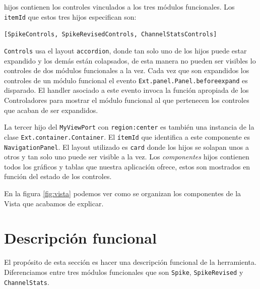 	hijos contienen los controles vinculados a los tres módulos funcionales. Los \texttt{itemId} que estos tres hijos especifican son:
    		\begin{center} \texttt{[SpikeControls, SpikeRevisedControls, ChannelStatsControls]}  \end{center}
	\texttt{Controls} usa el layout \texttt{accordion}, donde tan solo uno de los hijos puede estar expandido y los demás están
	colapsados, de esta manera no pueden ser visibles lo controles de dos módulos funcionales a la vez. Cada vez que son expandidos los
	controles de un módulo funcional el evento \texttt{Ext.panel.Panel.beforeexpand} es disparado. El handler asociado a este evento
	invoca la función apropiada de los Controladores para mostrar el módulo funcional al que pertenecen los controles que acaban de ser
	expandidos.
	\par
	La tercer hijo del \texttt{MyViewPort} con \texttt{region:center} es también una instancia de la clase \texttt{Ext.container.Container}. El
	\texttt{ítemId} que identifica a este componente es \texttt{NavigationPanel}. El layout utilizado es \texttt{card} donde los hijos se solapan
	unos a otros y tan solo uno puede ser visible a la vez. Los \emph{componentes} hijos contienen todos los gráficos y tablas que nuestra
	aplicación ofrece, estos son mostrados en función del estado de los controles.
	\par
	En la figura \ref{fig:vista} podemos ver como se organizan los componentes de la Vista que acabamos de explicar.
\section{Descripción funcional}
	El propósito de esta sección es hacer una descripción funcional de la herramienta. Diferenciamos entre tres módulos funcionales que son
	\texttt{Spike}, \texttt{SpikeRevised} y \texttt{ChannelStats}.
